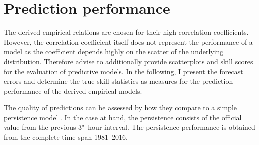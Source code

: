 \section{Prediction performance}
\label{sec:prediction_performance}
The derived empirical relations are chosen for their high correlation coefficients. However, the correlation coefficient itself does not represent the performance of a model as the coefficient depends highly on the scatter of the underlying distribution. Therefore \citet{Wing2005} advise to additionally provide scatterplots and skill scores for the evaluation of predictive models. In the following, I present the forecast errors and determine the true skill statistics as measures for the prediction performance of the derived empirical models.

The quality of predictions can be assessed by how they compare to a simple persistence model \citep{Detman1999}. In the case at hand, the persistence consists of the official \Kp{} value from the previous 3"~hour interval. The persistence performance is obtained from the complete \Kp{} time span 1981--2016.

